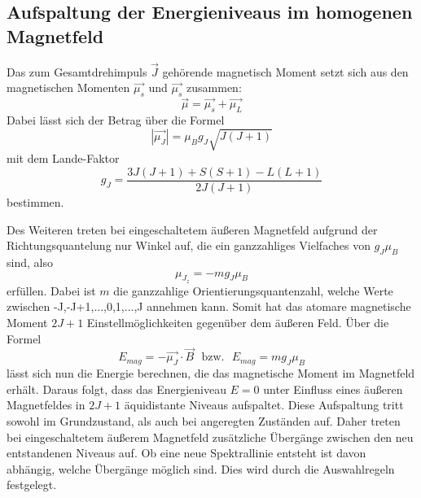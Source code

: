 \subsection{Aufspaltung der Energieniveaus im homogenen Magnetfeld}
Das zum Gesamtdrehimpuls $\vec{J}$ gehörende magnetisch Moment setzt sich aus den
magnetischen Momenten $\vec{\mu_s}$ und $\vec{\mu_s}$ zusammen:
\begin{equation}
  \vec{\mu}=\vec{\mu_s}+ \vec{\mu_L}
  \label{eqn:magges}
\end{equation}
Dabei lässt sich der Betrag über die Formel
\begin{equation}
  |\vec{\mu_J}|=\mu_B g_J\sqrt{J(J+1)}
  \label{eqn:muJ}
\end{equation}
mit dem Lande-Faktor
\begin{equation}
  g_J=\frac{3J(J+1)+S(S+1)-L(L+1)}{2J(J+1)}
  \label{eqn:gJ}
\end{equation}
bestimmen.

Des Weiteren treten bei eingeschaltetem äußeren Magnetfeld aufgrund der
Richtungsquantelung nur Winkel auf, die ein ganzzahliges Vielfaches von
$g_J \mu_B$ sind, also
\begin{equation}
  \mu_{J_z}=-mg_J \mu_B
  \label{eqn:richtung}
\end{equation}
erfüllen. Dabei ist $m$ die ganzzahlige Orientierungsquantenzahl, welche
Werte zwischen -J,-J+1,...,0,1,...,J annehmen kann. Somit hat das
atomare magnetische Moment $2J+1$ Einstellmöglichkeiten gegenüber dem
äußeren Feld. Über die Formel
\begin{equation}
  E_{mag}=-\vec{\mu_J}\cdot\vec{B}\:\:\:\text{bzw.}\:\:\:E_{mag}=mg_J \mu_B
  \label{eqn:emag}
\end{equation}
lässt sich nun die Energie berechnen, die das magnetische Moment
im Magnetfeld erhält. Daraus folgt, dass das Energieniveau $E=0$
unter Einfluss eines äußeren Magnetfeldes in $2J+1$ äquidistante
Niveaus aufspaltet.
Diese Aufspaltung tritt sowohl im Grundzustand, als auch bei
angeregten Zuständen auf. Daher treten bei eingeschaltetem
äußerem Magnetfeld zusätzliche Übergänge zwischen den neu entstandenen
Niveaus auf. Ob eine neue Spektrallinie entsteht ist davon abhängig, welche
Übergänge möglich sind. Dies wird durch die
Auswahlregeln festgelegt.

